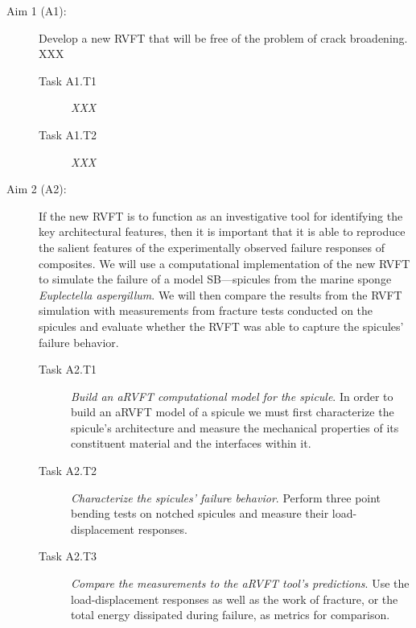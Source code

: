\documentclass[10pt,letterpaper]{article}
\begin{document}
    \begin{description}
      \item[Aim 1 (A1):] Develop a new RVFT that will be free of the problem of crack broadening. XXX
      \begin{description}
        \item[Task A1.T1] \textit{XXX}
        \item[Task A1.T2] \textit{XXX}
      \end{description}

      \item[Aim 2 (A2):] If the new RVFT is to function as an investigative tool for identifying the key architectural features, then it is important that it is able to reproduce the salient features of the experimentally observed failure responses of composites. We will use a computational implementation of the new RVFT to simulate the failure of a model SB---spicules from the marine sponge \textit{Euplectella aspergillum}. We will then compare the results from the RVFT simulation with measurements from fracture tests conducted on the spicules and evaluate whether the RVFT was able to capture the spicules' failure behavior.
      \begin{description}
        \item[Task A2.T1] \textit{Build an aRVFT computational model for the spicule}. In order to build an aRVFT model of a spicule we must first characterize the spicule's architecture and measure the mechanical properties of its constituent material and the interfaces within it.
        \item[Task A2.T2] \textit{Characterize the spicules' failure behavior}. Perform three point bending tests on notched spicules and measure their load-displacement responses.
        \item[Task A2.T3] \textit{Compare the measurements to the aRVFT tool's predictions}. Use the load-displacement responses as well as the work of fracture, or the total energy dissipated during failure, as metrics for comparison.
      \end{description}
    \end{description}
\end{document}
